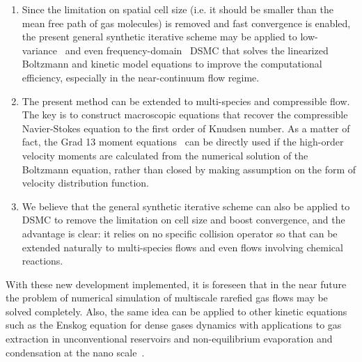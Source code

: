 \begin{enumerate}
	\item Since the limitation on spatial cell size (i.e. it should be smaller than the mean free path of gas molecules) is removed and fast convergence is enabled, the present general synthetic iterative scheme may be applied to low-variance~\cite{Radtke2009PRE,Radtke2011} and even frequency-domain~\cite{Ladiges2015JCP} DSMC that solves the linearized Boltzmann and kinetic model equations to improve the computational efficiency, especially in the near-continuum flow regime. 
	
	
	\item The present method can be extended to multi-species and compressible flow. The key is to construct macroscopic equations that recover the compressible Navier-Stokes equation to the first order of Knudsen number. As a matter of fact, the Grad 13 moment equations~\cite{Grad1949,henning} can be directly used if the high-order velocity moments are calculated from the numerical solution of the Boltzmann equation, rather than closed by making assumption on the form of velocity distribution function. 
	
	\item 
We believe that the general synthetic iterative scheme can also be applied to DSMC to remove the limitation on cell size and boost convergence, and the advantage is clear: it relies on no specific collision operator so that can be extended naturally to multi-species flows and even flows involving chemical reactions.
	
\end{enumerate}  


With these new development implemented, it is foreseen that in the near future the problem of numerical simulation of multiscale rarefied gas flows may be solved completely. Also, the same idea can be applied to other kinetic equations such as the Enskog equation for dense gases dynamics with applications to gas extraction in unconventional reservoirs and non-equilibrium evaporation and condensation at the nano scale~\cite{Lei2015Enskog,Wu2016JFM,Frezzotti2005}.






